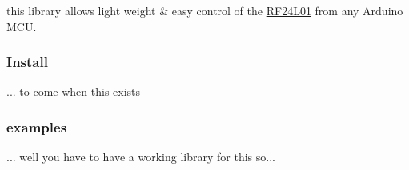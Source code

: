 this library allows light weight \& easy control of the \mbox{\hyperlink{namespace_r_f24_l01}{R\+F24\+L01}} from any Arduino M\+CU. \subsubsection*{Install}

... to come when this exists \subsubsection*{examples}

... well you have to have a working library for this so... 